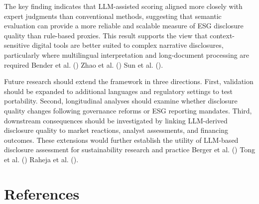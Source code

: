 \documentclass[
  12pt,
]{article}
\begin{document}
The key finding indicates that LLM-assisted scoring aligned more closely
with expert judgments than conventional methods, suggesting that
semantic evaluation can provide a more reliable and scalable measure of
ESG disclosure quality than rule-based proxies. This result supports the
view that context-sensitive digital tools are better suited to complex
narrative disclosures, particularly where multilingual interpretation
and long-document processing are required Bender et al.
() Zhao et al.
() Sun et al.
().

Future research should extend the framework in three directions. First,
validation should be expanded to additional languages and regulatory
settings to test portability. Second, longitudinal analyses should
examine whether disclosure quality changes following governance reforms
or ESG reporting mandates. Third, downstream consequences should be
investigated by linking LLM-derived disclosure quality to market
reactions, analyst assessments, and financing outcomes. These extensions
would further establish the utility of LLM-based disclosure assessment
for sustainability research and practice Berger et al.
() Tong et al.
() Raheja et al.
().

\section*{References}\label{references}
\end{document}
